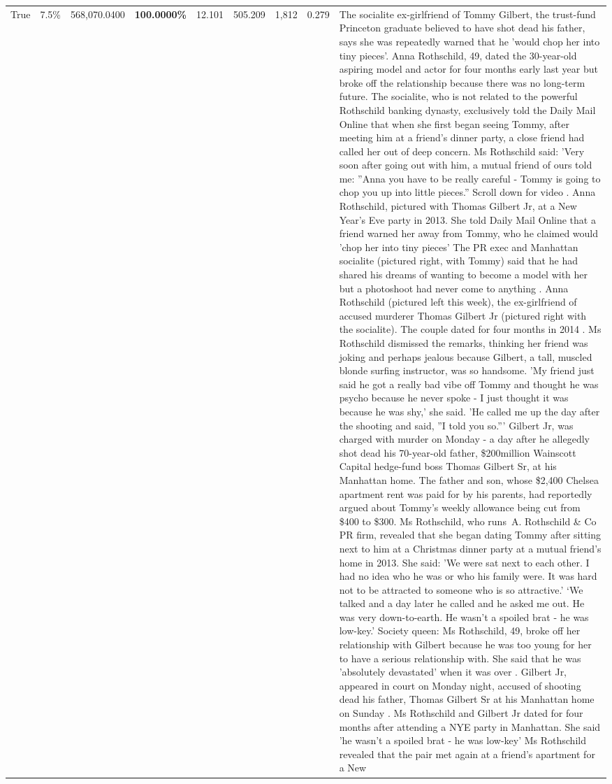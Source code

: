 \begin{table}[H]
\begin{tabular}{lllrlllll}
True & 7.5\% & 568,070.0400 & \bfseries \color{red} 100.0000\% & 12.101 & 505.209 & 1,812 & 0.279 & The socialite ex-girlfriend of Tommy Gilbert, the trust-fund Princeton graduate believed to have shot dead his father, says she was repeatedly warned that he 'would chop her into tiny pieces'. Anna Rothschild, 49, dated the 30-year-old aspiring model and actor for four months early last year but broke off the relationship because there was no long-term future. The socialite, who is not related to the powerful Rothschild banking dynasty, exclusively told the Daily Mail Online that when she first began seeing Tommy, after meeting him at a friend's dinner party, a close friend had called her out of deep concern. Ms Rothschild said: 'Very soon after going out with him, a mutual friend of ours told me: ''Anna you have to be really careful - Tommy is going to chop you up into little pieces.'' Scroll down for video . Anna Rothschild, pictured with Thomas Gilbert Jr, at a New Year's Eve party in 2013. She told Daily Mail Online that a friend warned her away from Tommy, who he claimed would 'chop her into tiny pieces' The PR exec and Manhattan socialite (pictured right, with Tommy) said that he had shared his dreams of wanting to become a model with her but a photoshoot had never come to anything . Anna Rothschild (pictured left this week), the ex-girlfriend of accused murderer Thomas Gilbert Jr (pictured right with the socialite). The couple dated for four months in 2014 . Ms Rothschild dismissed the remarks, thinking her friend was joking and perhaps jealous because Gilbert, a tall, muscled blonde surfing instructor, was so handsome. 'My friend just said he got a really bad vibe off Tommy and thought he was psycho because he never spoke - I just thought it was because he was shy,' she said. 'He called me up the day after the shooting and said, ''I told you so.''' Gilbert Jr, was charged with murder on Monday - a day after he allegedly shot dead his 70-year-old father, \$200million Wainscott Capital hedge-fund boss Thomas Gilbert Sr, at his Manhattan home. The father and son, whose \$2,400 Chelsea apartment rent was paid for by his parents, had reportedly argued about Tommy's weekly allowance being cut from \$400 to \$300. Ms Rothschild, who runs A. Rothschild \& Co PR firm, revealed that she began dating Tommy after sitting next to him at a Christmas dinner party at a mutual friend's home in 2013. She said: 'We were sat next to each other. I had no idea who he was or who his family were. It was hard not to be attracted to someone who is so attractive.' ‘We talked and a day later he called and he asked me out. He was very down-to-earth. He wasn’t a spoiled brat - he was low-key.’ Society queen: Ms Rothschild, 49, broke off her relationship with Gilbert because he was too young for her to have a serious relationship with. She said that he was 'absolutely devastated' when it was over . Gilbert Jr, appeared in court on Monday night, accused of shooting dead his father, Thomas Gilbert Sr at his Manhattan home on Sunday . Ms Rothschild and Gilbert Jr dated for four months after attending a NYE party in Manhattan. She said 'he wasn't a spoiled brat - he was low-key' Ms Rothschild revealed that the pair met again at a friend’s apartment for a New 
\end{tabular}
\end{table}
